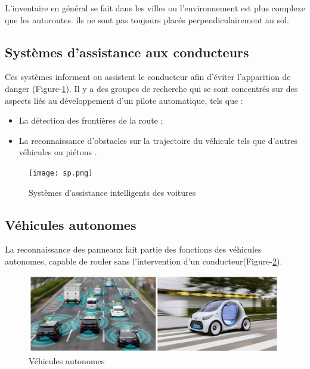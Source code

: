 L'inventaire en général se fait dans les villes ou l'environnement est plus complexe que les autoroutes. ils ne sont pas toujours placés perpendiculairement au sol.

\subsection{Systèmes d'assistance aux conducteurs}

Ces systèmes informent ou assistent le conducteur afin d’éviter l’apparition de danger (Figure-\ref{fig:systeme intelligents}).
Il y a des groupes de recherche qui se sont concentrés sur des aspects liés au développement d'un pilote automatique, tels que :
\begin{itemize}
  \item La détection des frontières de la route \cite{3,4} ;
    \item La reconnaissance d'obstacles sur la trajectoire du véhicule tels que d'autres véhicules ou piétons \cite{5,6,7}.
  \end{itemize}
 \vspace{0.5cm} 
 \begin{figure}[h]
        \centering
        \texttt{[image: sp.png]}
        \caption{Systèmes d'assistance intelligents des voitures}
        \label{fig:systeme intelligents}
\end{figure}
  
\subsection{Véhicules autonomes}

La reconnaissance des panneaux fait partie des fonctions des véhicules autonomes, capable de rouler sans l'intervention d'un conducteur(Figure-\ref{fig:vehicule autonomes}).\\

\begin{figure}[h]
        \centering
        \includegraphics[scale=0.5]{images/tt.png}
        \caption{Véhicules autonomes}
        \label{fig:vehicule autonomes}
\end{figure}
       
